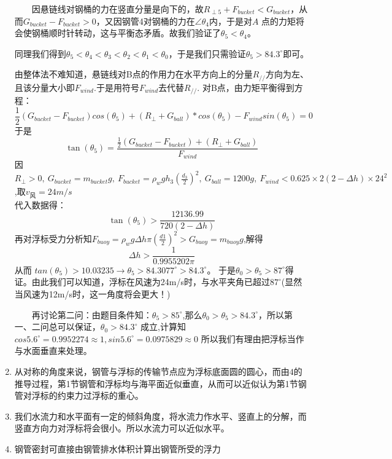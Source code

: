 \documentclass[a4paper,12pt]{ctexart}
\begin{document}
\begin{enumerate}
~~~~因悬链线对钢桶的力在竖直分量是向下的，故$R_{\perp5}+F_{bucket}<G_{bucket}$，从而$G_{bucket}-F_{bucket}>0$，又因钢管4对钢桶的力在$\angle \theta_4$内，于是对$A$ 点的力矩将会使钢桶顺时针转动，这与平衡态矛盾。故我们验证了$\theta_5<\theta_4$。

同理我们得到$\theta_5<\theta_4<\theta_3<\theta_2<\theta_1<\theta_0$，于是我们只需验证$\theta_5>84.3^{\circ}$即可。

由整体法不难知道，悬链线对B点的作用力在水平方向上的分量$R_{//}$方向为左、且该分量大小即$F_{wind}$.于是用符号$F_{wind}$去代替$R_{//}$.
对B点，由力矩平衡得到方程：\\
\begin{equation}
\frac{1}{2}(G_{bucket}-F_{bucket})cos(\theta_5)+(R_{\perp}+G_{ball})*cos(\theta_5)-F_{wind}sin(\theta_5)=0
\end{equation}
于是
\begin{equation}
\tan(\theta_5)=\frac{\frac{1}{2}(G_{bucket}-F_{bucket})+(R_{\perp}+G_{ball})}{F_{wind}}
\end{equation}
因$R_{\perp}>0, \ G_{bucket}=m_{bucket}g,\ F_{bucket}=\rho_wgh_3(\frac{d_3}{2})^2,\ G_{ball}=1200g, \ F_{wind}<0.625\times2(2-\Delta h)\times24^2$,取$v_风=24m/s$\\
代入数据得：
\begin{equation}
\tan(\theta_5)>\frac{12136.99}{720(2-\Delta h)}
\end{equation}
再对浮标受力分析知$F_{buoy}=\rho_w g\Delta h\pi (\frac{d1}{2})^2>G_{buoy}=m_{buoy}g$,解得
\begin{equation}
\Delta h>\frac{1}{0.9955202\pi}
\end{equation}
从而
$tan(\theta_5)>10.03235\rightarrow\theta_5>84.3077^{\circ}>84.3^{\circ}$。 于是$\theta_0>\theta_5>87^{\circ}$得证。由此我们可以知道，浮标在风速为24m/s时，与水平夹角已超过$87^{\circ}$(显然当风速为12m/s时，这一角度将会更大！)

~~~~再讨论第二问：由题目条件知：$\theta_5>85^{\circ}$,那么$\theta_0>\theta_5>84.3^{\circ}$，所以第一、二问总可以保证，$\theta_0>84.3^{\circ}$ 成立,计算知
$cos5.6^{\circ}= 0.9952274\approx1,sin5.6^{\circ}=0.0975829\approx0$
所以我们有理由把浮标当作与水面垂直来处理。

\item 从对称的角度来说，钢管与浮标的传输节点应为浮标底面圆的圆心，而由$4$的推导过程，第1节钢管和浮标均与海平面近似垂直，从而可以近似认为第1节钢管对浮标的约束力过浮标的重心。\\
\item 我们水流力和水平面有一定的倾斜角度，将水流力作水平、竖直上的分解，而竖直方向力对浮标将会很小。所以水流力可以近似水平。
\item 钢管密封可直接由钢管排水体积计算出钢管所受的浮力
\end{enumerate}
\end{document}
